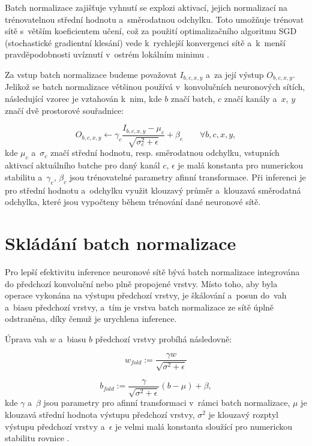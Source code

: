 Batch normalizace zajišťuje vyhnutí se explozi aktivací, jejich normalizací na trénovatelnou střední hodnotu a~směrodatnou odchylku. Toto umožňuje trénovat sítě s~větším koeficientem učení, což za použití optimalizačního algoritmu SGD (stochastické gradientní klesání) vede k~rychlejší konvergenci sítě a~k~menší pravděpodobnosti uvíznutí v~ostrém lokálním minimu \cite{bjorck2018understanding}. 

Za vstup batch normalizace budeme považovat $I_{b,c,x,y}$ a~za její výstup $O_{b,c,x,y}$. Jelikož se batch normalizace většinou používá v~konvolučních neuronových sítích, následující vzorec je vztahován k~nim, kde $b$ značí batch, $c$ značí kanály a~$x$, $y$ značí dvě prostorové souřadnice:

\begin{equation}
    O_{b,c,x,y} \leftarrow \gamma_c \frac{I_{b,c,x,y} - \mu_c}{\sqrt{\sigma_c^2 + \epsilon}} + \beta_c \qquad
    \forall b,c,x,y,
\end{equation}
kde $\mu_c$ a~$\sigma_c$ značí střední hodnotu, resp. směrodatnou odchylku, vstupních aktivací aktuálního batche pro daný kanál $c$, $\epsilon$ je malá konstanta pro numerickou stabilitu a~$\gamma_c$, $\beta_c$ jsou trénovatelné parametry afinní transformace. Při inferenci je pro střední hodnotu a~odchylku využit klouzavý průměr a~klouzavá směrodatná odchylka, které jsou vypočteny během trénování dané neuronové sítě.
\cite{bjorck2018understanding}

\section{Skládání batch normalizace}
\label{section:batch_norm_fold}
Pro lepší efektivitu inference neuronové sítě bývá batch normalizace integrována do předchozí konvoluční nebo plně propojené vrstvy. Místo toho, aby byla operace vykonána na výstupu předchozí vrstvy, je škálování a~posun  do~vah a~biasu předchozí vrstvy, a~tím je vrstva batch normalizace ze sítě úplně odstraněna, díky čemuž je urychlena inference.

Úprava vah $w$ a~biasu $b$ předchozí vrstvy probíhá následovně:

\begin{equation}
    w_{fold} := \frac{\gamma w}{\sqrt{\sigma^2 + \epsilon}}
\end{equation}

\begin{equation}
    b_{fold} := \frac{\gamma}{\sqrt{\sigma^2 + \epsilon}} (b - \mu) + \beta,
\end{equation}
kde $\gamma$ a~$\beta$ jsou parametry pro afinní transformaci v~rámci batch normalizace, $\mu$ je klouzavá střední hodnota výstupu předchozí vrstvy, $\sigma^2$ je klouzavý rozptyl výstupu předchozí vrstvy a~$\epsilon$ je velmi malá konstanta sloužící pro numerickou stabilitu rovnice \cite{https://doi.org/10.48550/arxiv.1712.05877}.

